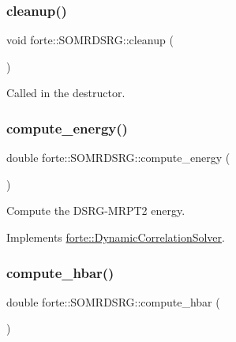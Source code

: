 \subsubsection{\texorpdfstring{cleanup()}{cleanup()}}
{\footnotesize\ttfamily void forte\+::\+S\+O\+M\+R\+D\+S\+R\+G\+::cleanup (\begin{DoxyParamCaption}{ }\end{DoxyParamCaption})\hspace{0.3cm}{\ttfamily [protected]}}



Called in the destructor. 

\mbox{\label{classforte_1_1_s_o_m_r_d_s_r_g_a80e229a7a41f301ebab0b8d063f8e243}} 
\subsubsection{\texorpdfstring{compute\+\_\+energy()}{compute\_energy()}}
{\footnotesize\ttfamily double forte\+::\+S\+O\+M\+R\+D\+S\+R\+G\+::compute\+\_\+energy (\begin{DoxyParamCaption}{ }\end{DoxyParamCaption})\hspace{0.3cm}{\ttfamily [virtual]}}



Compute the D\+S\+R\+G-\/\+M\+R\+P\+T2 energy. 



Implements \mbox{\hyperlink{classforte_1_1_dynamic_correlation_solver_aff4c7ebdca64563939d6e3ab8a262150}{forte\+::\+Dynamic\+Correlation\+Solver}}.

\mbox{\label{classforte_1_1_s_o_m_r_d_s_r_g_a991de8522e933316133cbeb5db5cbb04}} 
\subsubsection{\texorpdfstring{compute\+\_\+hbar()}{compute\_hbar()}}
{\footnotesize\ttfamily double forte\+::\+S\+O\+M\+R\+D\+S\+R\+G\+::compute\+\_\+hbar (\begin{DoxyParamCaption}{ }\end{DoxyParamCaption})\hspace{0.3cm}{\ttfamily [protected]}}



